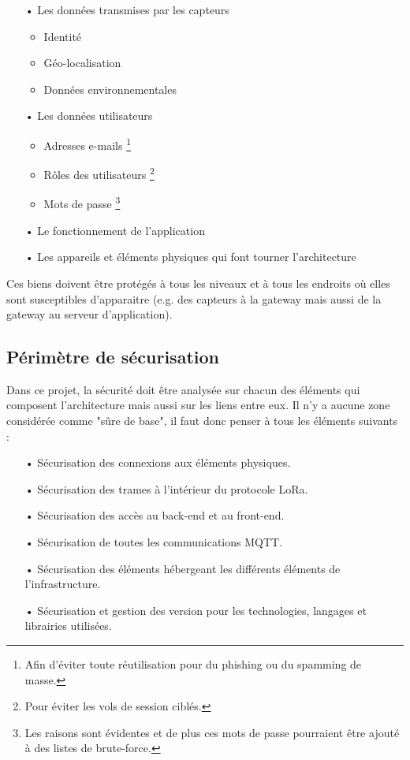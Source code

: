 \documentclass[12pt]{article}
\begin{document}
\begin{itemize}
\item[•] Les données transmises par les capteurs
\begin{itemize}
\item Identité
\item Géo-localisation
\item Données environnementales
\end{itemize}
\item[•] Les données utilisateurs
\begin{itemize}
\item Adresses e-mails \footnote{Afin d'éviter toute réutilisation pour du phishing ou du spamming de masse.}
\item Rôles des utilisateurs \footnote{Pour éviter les vols de session ciblés.}
\item Mots de passe \footnote{Les raisons sont évidentes et de plus ces mots de passe pourraient être ajouté à des listes de brute-force.}
\end{itemize}
\item[•] Le fonctionnement de l'application
\item[•] Les appareils et éléments physiques qui font tourner l'architecture
\end{itemize}

Ces biens doivent être protégés à tous les niveaux et à tous les endroits où elles sont susceptibles d'apparaitre (e.g. des capteurs à la gateway mais aussi de la gateway au serveur d'application).

\subsection{Périmètre de sécurisation}

Dans ce projet, la sécurité doit être analysée sur chacun des éléments qui composent l'architecture mais aussi sur les liens entre eux. Il n'y a aucune zone considérée comme "sûre de base", il faut donc penser à tous les éléments suivants :

\begin{itemize}
\item[•] Sécurisation des connexions aux éléments physiques.
\item[•] Sécurisation des trames à l'intérieur du protocole LoRa.
\item[•] Sécurisation des accès au back-end et au front-end.
\item[•] Sécurisation de toutes les communications MQTT.
\item[•] Sécurisation des éléments hébergeant les différents éléments de l'infrastructure.
\item[•] Sécurisation et gestion des version pour les technologies, langages et librairies utilisées.
\end{itemize}
\end{document}
